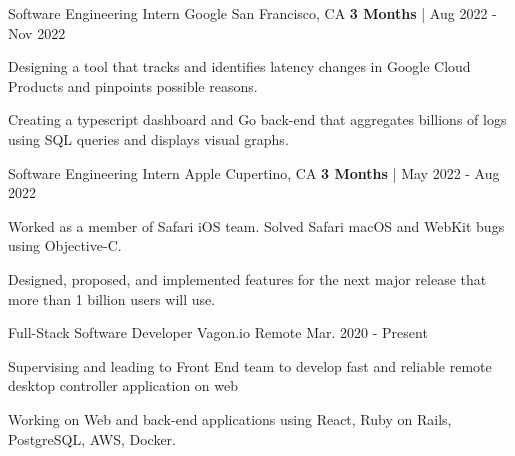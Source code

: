 
\begin{cventries}

  \cvopenentry
   {Software Engineering Intern} %
    {Google} %
    {San Francisco, CA} %
    {\textbf{3 Months} | Aug 2022 - Nov 2022} %
    {
      \begin{cvitems} %
        \item {Designing a tool that tracks and identifies latency changes in Google Cloud Products and pinpoints possible reasons.}
        \item {Creating a typescript dashboard and Go back-end that aggregates billions of logs using SQL queries and displays visual graphs.}
      \end{cvitems}
    }
  \cvopenentry
   {Software Engineering Intern} %
    {Apple} %
    {Cupertino, CA} %
    {\textbf{3 Months} | May 2022 - Aug 2022} %
    {
      \begin{cvitems} %
        \item {Worked as a member of Safari iOS team. Solved Safari macOS and WebKit bugs using Objective-C. }
        \item {Designed, proposed, and implemented features for the next major release that more than 1 billion users will use.}
      \end{cvitems}
    }
  \cvopenentry
   {Full-Stack Software Developer
   } %
    {Vagon.io} %
    {Remote} %
    {Mar. 2020 - Present} %
    {
      \begin{cvitems} %
        \item {Supervising and leading to Front End team to develop fast and reliable remote desktop controller application on web}
        \item {Working on Web and back-end applications using React, Ruby on Rails, PostgreSQL, AWS, Docker.}

\end{cvitems}}
\end{cventries}

